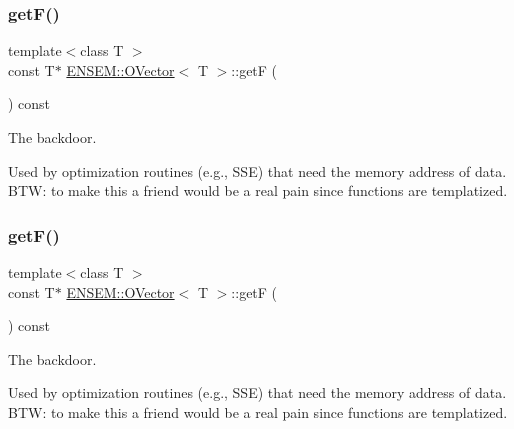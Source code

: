 \mbox{\label{classENSEM_1_1OVector_ab4767b83741c029b996a49662c021f88}} 
\subsubsection{\texorpdfstring{getF()}{getF()}\hspace{0.1cm}{\footnotesize\ttfamily [1/6]}}
{\footnotesize\ttfamily template$<$class T $>$ \\
const T$\ast$ \mbox{\hyperlink{classENSEM_1_1OVector}{E\+N\+S\+E\+M\+::\+O\+Vector}}$<$ T $>$\+::getF (\begin{DoxyParamCaption}{ }\end{DoxyParamCaption}) const\hspace{0.3cm}{\ttfamily [inline]}}



The backdoor. 

Used by optimization routines (e.\+g., S\+SE) that need the memory address of data. B\+TW\+: to make this a friend would be a real pain since functions are templatized. \mbox{\label{classENSEM_1_1OVector_ab4767b83741c029b996a49662c021f88}} 
\subsubsection{\texorpdfstring{getF()}{getF()}\hspace{0.1cm}{\footnotesize\ttfamily [2/6]}}
{\footnotesize\ttfamily template$<$class T $>$ \\
const T$\ast$ \mbox{\hyperlink{classENSEM_1_1OVector}{E\+N\+S\+E\+M\+::\+O\+Vector}}$<$ T $>$\+::getF (\begin{DoxyParamCaption}{ }\end{DoxyParamCaption}) const\hspace{0.3cm}{\ttfamily [inline]}}



The backdoor. 

Used by optimization routines (e.\+g., S\+SE) that need the memory address of data. B\+TW\+: to make this a friend would be a real pain since functions are templatized. \mbox{\label{classENSEM_1_1OVector_ab4767b83741c029b996a49662c021f88}} 
